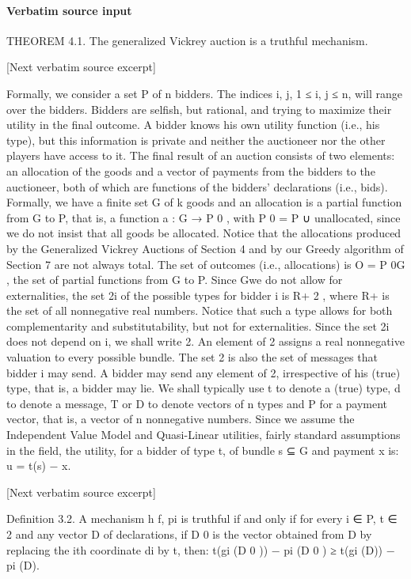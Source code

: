\documentclass[10pt]{article}
\begin{document}
\paragraph{Verbatim source input}
\begin{ReviewVerbatim}
THEOREM 4.1. The generalized Vickrey auction is a truthful mechanism.

[Next verbatim source excerpt]

Formally, we consider a set P of n bidders. The indices i, j, 1 ≤ i, j ≤ n, will
range over the bidders. Bidders are selfish, but rational, and trying to maximize their
utility in the final outcome. A bidder knows his own utility function (i.e., his type),
but this information is private and neither the auctioneer nor the other players have
access to it. The final result of an auction consists of two elements: an allocation
of the goods and a vector of payments from the bidders to the auctioneer, both of
which are functions of the bidders’ declarations (i.e., bids). Formally, we have a
finite set G of k goods and an allocation is a partial function from G to P, that is, a
function a : G → P 0 , with P 0 = P ∪ {unallocated}, since we do not insist that all
goods be allocated. Notice that the allocations produced by the Generalized Vickrey
Auctions of Section 4 and by our Greedy algorithm of Section 7 are not always
total. The set of outcomes (i.e., allocations) is O = P 0G , the set of partial functions
from G to P. Since Gwe do not allow for externalities, the set 2i of the possible types
for bidder i is R+ 2 , where R+ is the set of all nonnegative real numbers. Notice
that such a type allows for both complementarity and substitutability, but not for
externalities. Since the set 2i does not depend on i, we shall write 2. An element
of 2 assigns a real nonnegative valuation to every possible bundle. The set 2 is
also the set of messages that bidder i may send. A bidder may send any element of
2, irrespective of his (true) type, that is, a bidder may lie. We shall typically use t
to denote a (true) type, d to denote a message, T or D to denote vectors of n types
and P for a payment vector, that is, a vector of n nonnegative numbers.
Since we assume the Independent Value Model and Quasi-Linear utilities, fairly
standard assumptions in the field, the utility, for a bidder of type t, of bundle s ⊆ G
and payment x is:
u = t(s) − x.

[Next verbatim source excerpt]

Definition 3.2. A mechanism h f, pi is truthful if and only if for every i ∈ P,
t ∈ 2 and any vector D of declarations, if D 0 is the vector obtained from D by
replacing the ith coordinate di by t, then: t(gi (D 0 )) − pi (D 0 ) ≥ t(gi (D)) − pi (D).


\end{ReviewVerbatim}
\end{document}
